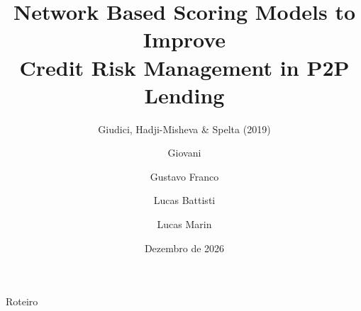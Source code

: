 \documentclass[aspectratio=169,10pt]{beamer}
\title{Network Based Scoring Models to Improve\\Credit Risk Management in P2P Lending}
\subtitle{Giudici, Hadji-Misheva \& Spelta (2019)}
\author{Giovani \and Gustavo Franco \and Lucas Battisti \and Lucas Marin}
\institute{Tópicos em Redes Complexas -- UFSCar}
\date{Dezembro de 2026}
\begin{document}
\begin{frame}
  \titlepage
\end{frame}

\begin{frame}{Roteiro}
  \tableofcontents
\end{frame}






\end{document}

